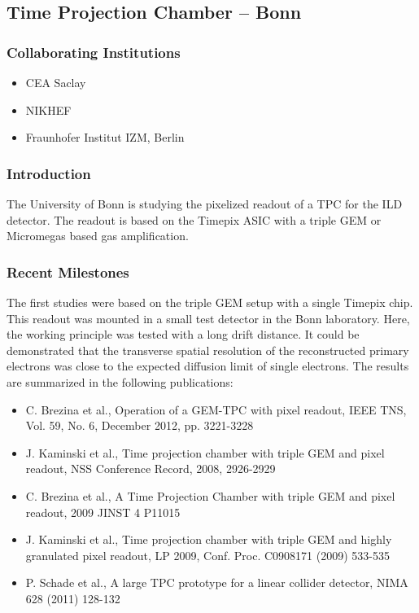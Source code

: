 \subsection{Time Projection Chamber -- Bonn}
\subsubsection{Collaborating Institutions}
\begin{itemize}
	\item CEA Saclay
	\item NIKHEF
	\item Fraunhofer Institut IZM, Berlin
\end{itemize}
\subsubsection{Introduction}
The University of Bonn is studying the pixelized readout of a TPC for the ILD detector. The readout is based on the Timepix ASIC with a triple GEM or Micromegas based gas amplification.

\subsubsection{Recent Milestones}
The first studies were based on the triple GEM setup with a single Timepix chip. This readout was mounted in a small test detector in the Bonn laboratory. Here, the working principle was tested with a long drift distance. It could be demonstrated that the transverse spatial resolution of the reconstructed primary electrons was close to the expected diffusion limit of single electrons. The results are summarized in the following publications:
\begin{itemize}
\item C. Brezina et al., Operation of a GEM-TPC with pixel readout, IEEE TNS, Vol. 59, No. 6, December 2012, pp. 3221-3228
\item J. Kaminski et al., Time projection chamber with triple GEM and pixel readout, NSS Conference Record, 2008, 2926-2929
\item C. Brezina et al., A Time Projection Chamber with triple GEM and pixel readout, 2009 JINST 4 P11015
\item J. Kaminski et al., Time projection chamber with triple GEM and highly granulated pixel readout, LP 2009, Conf. Proc. C0908171 (2009) 533-535
\item P. Schade et al., A large TPC prototype for a linear collider detector, NIMA 628 (2011) 128-132
\end{itemize}

